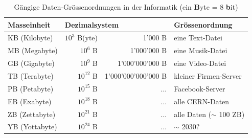 \begin{table}[H]
  \centering
  \begin{tabular}{@{}l|rr|l@{}}
    \toprule
    \textbf{Masseinheit} & \multicolumn{2}{l|}{\textbf{Dezimalsystem}} & Grössenordnung                                   \\ \midrule
    KB (Kilobyte)        & $10^3$ B(yte)                               & 1’000 B             & eine Text-Datei            \\
    MB (Megabyte)        & $10^6$ B                                    & 1’000’000 B         & eine Musik-Datei           \\
    GB (Gigabyte)        & $10^9$ B                                    & 1'000'000'000 B     & eine Video-Datei           \\
    TB (Terabyte)        & $10^{12}$ B                                 & 1'000'000'000'000 B & kleiner Firmen-Server      \\
    PB (Petabyte)        & $10^{15}$ B                                 & ...                 & Facebook-Server            \\
    EB (Exabyte)         & $10^{18}$ B                                 & ...                 & alle CERN-Daten            \\
    ZB (Zettabyte)       & $10^{21}$ B                                 & ...                 & alle Daten ($\sim$ 100 ZB) \\
    YB (Yottabyte)       & $10^{24}$ B                                 & ...                 & $\sim$ 2030?               \\ \bottomrule
  \end{tabular}
  \caption{Gängige Daten-Grössenordnungen in der Informatik (ein \textbf{B}yte = 8 \textbf{b}it)}
  \label{table:daten-groessenordnungen}
\end{table}
